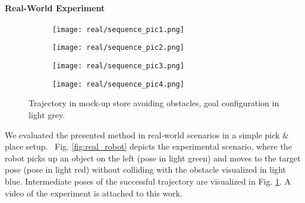 \paragraph{Real-World Experiment}
\label{par:real_world}
%
\begin{figure}[hb]
  \centering
  \begin{subfigure}[b]{0.35\linewidth}
    \texttt{[image: real/sequence\_pic1.png]}
  \end{subfigure}
  \begin{subfigure}[b]{0.35\linewidth}
    \texttt{[image: real/sequence\_pic2.png]}
  \end{subfigure}
  \par\smallskip
  \begin{subfigure}[b]{0.35\linewidth}
    \texttt{[image: real/sequence\_pic3.png]}
  \end{subfigure}
  \begin{subfigure}[b]{0.35\linewidth}
    \texttt{[image: real/sequence\_pic4.png]}
  \end{subfigure}
  \caption{Trajectory in mock-up store avoiding obstacles, goal configuration in light grey.}%
  \label{fig:real_case}
\end{figure}
%
We evaluated the presented method in real-world scenarios in a simple pick \& place setup. ~{Fig. \ref{fig:real_robot}} depicts the experimental scenario, where the robot picks up an object on the left (pose in light green) and moves to the target pose (pose in light red) without colliding with the obstacle visualized in light blue. Intermediate poses of the successful trajectory are visualized in Fig. \ref{fig:real_case}. A video of the experiment is attached to this work.
%
